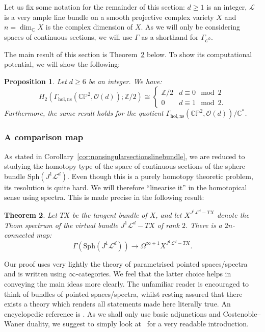 \documentclass[a4paper]{amsart}
\newcommand{\bZ}{\mathbb Z}
\newcommand{\bC}{\mathbb C}
\newcommand{\bP}{\mathbb P}
\newcommand{\cC}{\mathcal C}
\newcommand{\cL}{\mathcal L}
\newcommand{\cO}{\mathcal O}
\newcommand{\lra}{\longrightarrow}
\newcommand{\Sph}{\mathrm{Sph}}
\theoremstyle{plain}
\newtheorem{theorem}{Theorem}[section]
\newtheorem{proposition}[theorem]{Proposition}
\theoremstyle{definition}
\begin{document}
Let us fix some notation for the remainder of this section: $d \geq 1$ is an integer, $\cL$ is a very ample line bundle on a smooth projective complex variety $X$ and $n = \dim_\bC X$ is the complex dimension of $X$. As we will only be considering spaces of continuous sections, we will use $\Gamma$ as a shorthand for $\Gamma_{\cC^0}$.

The main result of this section is Theorem~\ref{thm:comparisoninfiniteloopspace} below. To show its computational potential, we will show the following:
\begin{proposition}\label{prop:zmodtwocomputation}
Let $d \geq 6$ be an integer. We have:
\[
    H_2(\Gamma_{\mathrm{hol,ns}}(\bC\bP^2, \cO(d)); \bZ/2) \cong \begin{cases} \bZ/2 & d \equiv 0 \mod 2 \\ 0 & d \equiv 1 \mod 2. \end{cases}
\]
Furthermore, the same result holds for the quotient $\Gamma_{\mathrm{hol,ns}}(\bC\bP^2, \cO(d)) / \bC^*$.
\end{proposition}

\subsubsection{A comparison map}

As stated in Corollary~\ref{cor:nonsingularsectionslinebundle}, we are reduced to studying the homotopy type of the space of continuous sections of the sphere bundle $\Sph(J^1\cL^d)$. Even though this is a purely homotopy theoretic problem, its resolution is quite hard. We will therefore ``linearise it'' in the homotopical sense using spectra. This is made precise in the following result:
\begin{theorem}\label{thm:comparisoninfiniteloopspace}
Let $TX$ be the tangent bundle of $X$, and let $X^{J^1\cL^d - TX}$ denote the Thom spectrum of the virtual bundle $J^1\cL^d - TX$ of rank $2$. There is a $2n$-connected map:
\[
    \Gamma(\mathrm{Sph}(J^1\cL^d)) \lra \Omega^{\infty+1} X^{J^1\cL^d - TX}.
\]
\end{theorem}

Our proof uses very lightly the theory of parametrised pointed spaces/spectra and is written using $\infty$-categories. We feel that the latter choice helps in conveying the main ideas more clearly. The unfamiliar reader is encouraged to think of bundles of pointed spaces/spectra, whilst resting assured that there exists a theory which renders all statements made here literally true. An encyclopedic reference is \cite{may_parametrized_2006}. As we shall only use basic adjunctions and Costenoble--Waner duality, we suggest to simply look at~\cite[Appendix A]{land_reducibility_2021} for a very readable introduction.
\end{document}
